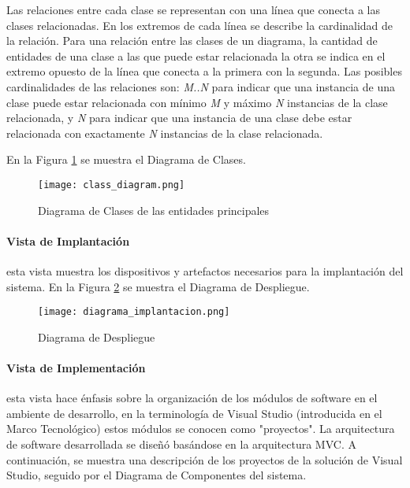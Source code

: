 Las relaciones entre cada clase se representan con una línea que conecta a las clases relacionadas. En los extremos de cada línea se describe la cardinalidad de la relación. Para una relación entre las clases de un diagrama, la cantidad de entidades de una clase a las que puede estar relacionada la otra se indica en el extremo opuesto de la línea que conecta a la primera con la segunda. Las posibles cardinalidades de las relaciones son: \textit{M..N} para indicar que una instancia de una clase puede estar relacionada con mínimo \textit{M} y máximo \textit{N} instancias de la clase relacionada, y \textit{N} para indicar que una instancia de una clase debe estar relacionada con exactamente \textit{N} instancias de la clase relacionada.

En la Figura \ref{fig:class_diagram_main} se muestra el Diagrama de Clases.

\begin{figure}[H]
    \centering
    \texttt{[image: class\_diagram.png]}
    \caption{Diagrama de Clases de las entidades principales}
    \label{fig:class_diagram_main}
\end{figure}

\paragraph{Vista de Implantación} esta vista muestra los dispositivos y artefactos necesarios para la implantación del sistema. En la Figura \ref{fig:diagrama_implantacion} se muestra el Diagrama de Despliegue.

\begin{figure}[H]
    \centering
    \texttt{[image: diagrama\_implantacion.png]}
    \caption{Diagrama de Despliegue}
    \label{fig:diagrama_implantacion}
\end{figure}

\paragraph{Vista de Implementación} esta vista hace énfasis sobre la organización de los módulos de software en el ambiente de desarrollo, en la terminología de Visual Studio (introducida en el Marco Tecnológico) estos módulos se conocen como "proyectos". La arquitectura de software desarrollada se diseñó basándose en la arquitectura MVC. A continuación, se muestra una descripción de los proyectos de la solución de Visual Studio, seguido por el Diagrama de Componentes del sistema.


